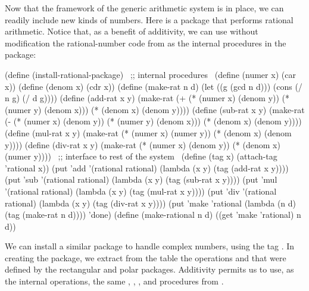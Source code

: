 \noindent
Now that the framework of the generic arithmetic system is in place, we can
readily include new kinds of numbers.  Here is a package that performs rational
arithmetic.  Notice that, as a benefit of additivity, we can use without
modification the rational-number code from  as the internal
procedures in the package:

\begin{codeBlock}
(define (install-rational-package)
  ~\textrm{;; internal procedures}~
  (define (numer x) (car x))
  (define (denom x) (cdr x))
  (define (make-rat n d)
    (let ((g (gcd n d)))
      (cons (/ n g) (/ d g))))
  (define (add-rat x y)
    (make-rat (+ (* (numer x) (denom y))
                 (* (numer y) (denom x)))
              (* (denom x) (denom y))))
  (define (sub-rat x y)
    (make-rat (- (* (numer x) (denom y))
                 (* (numer y) (denom x)))
              (* (denom x) (denom y))))
  (define (mul-rat x y)
    (make-rat (* (numer x) (numer y))
              (* (denom x) (denom y))))
  (define (div-rat x y)
    (make-rat (* (numer x) (denom y))
              (* (denom x) (numer y))))
  ~\textrm{;; interface to rest of the system}~
  (define (tag x) (attach-tag 'rational x))
  (put 'add '(rational rational)
       (lambda (x y) (tag (add-rat x y))))
  (put 'sub '(rational rational)
       (lambda (x y) (tag (sub-rat x y))))
  (put 'mul '(rational rational)
       (lambda (x y) (tag (mul-rat x y))))
  (put 'div '(rational rational)
       (lambda (x y) (tag (div-rat x y))))
  (put 'make 'rational
       (lambda (n d) (tag (make-rat n d))))
  'done)
(define (make-rational n d)
  ((get 'make 'rational) n d))
\end{codeBlock}

\noindent
We can install a similar package to handle complex numbers, using the tag
.  In creating the package, we extract from the table the
operations  and  that were
defined by the rectangular and polar packages.  Additivity permits us to use,
as the internal operations, the same , ,
, and  procedures from .

